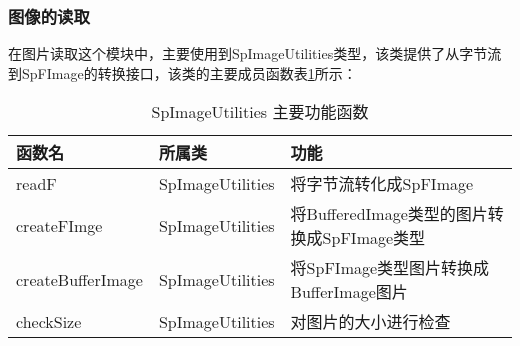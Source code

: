 \subsubsection{图像的读取}
在图片读取这个模块中，主要使用到SpImageUtilities类型，该类提供了从字节流到SpFImage的转换接口，该类的主要成员函数表\ref{tab:SpImageUtilities_function}所示：
\begin{table}[h] %
\caption{SpImageUtilities 主要功能函数} %
\centering
\label{tab:SpImageUtilities_function}
\begin{tabular}{p{3cm}|p{3cm}|p{6cm}} %
\hline
\hline
函数名  & 所属类 & 功能 \\ %
\hline %
readF  & SpImageUtilities & 将字节流转化成SpFImage\\
\hline
createFImge  & SpImageUtilities & 将BufferedImage类型的图片转换成SpFImage类型\\
\hline
createBufferImage & SpImageUtilities & 将SpFImage类型图片转换成BufferImage图片\\
\hline
checkSize  & SpImageUtilities & 对图片的大小进行检查\\
\hline
\hline
\end{tabular}
\end{table}

